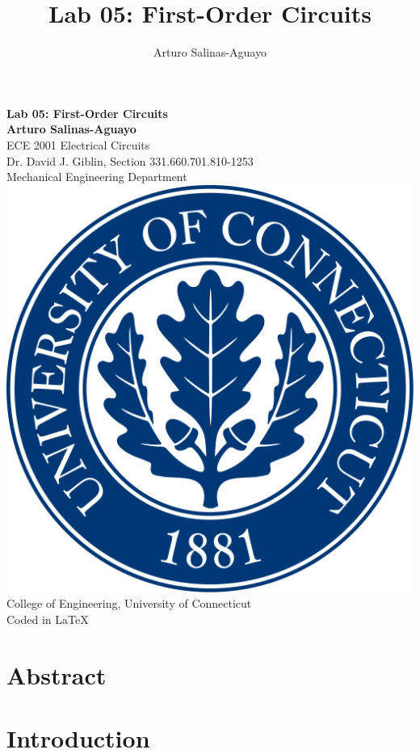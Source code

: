\documentclass[12pt]{article}
\author{Arturo Salinas-Aguayo}
\title{Lab 05: First-Order Circuits}
\begin{document}
\newcommand{\closure}[2][3]{%
	{}\mkern#1mu\overline{\mkern-#1mu#2}}
\newcommand\ncoverline[1]{\mkern1mu\overline{\mkern-1mu#1\mkern-1mu}\mkern1mu}
\begin{titlepage}
	\centering
	\vspace*{3cm}
	\huge\textbf{Lab 05: First-Order Circuits}\\

	\vspace{5cm}
	\Large\textbf{Arturo Salinas-Aguayo}\\
	\normalsize
	ECE 2001 Electrical Circuits\\
	Dr. David J. Giblin, Section 331.660.701.810-1253\\
	Mechanical Engineering Department
	\vfill
	\includegraphics[scale=0.1]{uconnlogo}\\
	College of Engineering, University of Connecticut\\
	\scriptsize{Coded in \LaTeX}
	\vspace*{1cm}
\end{titlepage}
\tableofcontents
\newpage
\section{Abstract}
\newpage
\section{Introduction}
\end{document}
